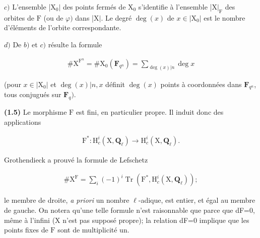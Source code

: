 \documentclass[10pt,leqno]{article}
\begin{document}
\noindent \(c)\) L’ensemble |\(\mathrm{X}_{0}|\) des points fermés de \(\mathrm{X}_{0}\) s’identifie à l’ensemble |\(\mathrm{X}|_{\mathrm{F}}\) des orbites de \(\mathrm{F}\) (ou de \(\varphi )\) dans |\(\mathrm{X}|\). Le degré \(\operatorname{deg}(x)\) de \(x\in |\mathrm{X}_{0}|\) est le nombre d’éléments de l’orbite correspondante.\par

\noindent \(d)\) De \(b)\) et \(c)\) résulte la formule\par

\begin{equation*}\begin{gathered}\# \mathrm{X}^{\mathrm{F}^{n}} = \# \mathrm{X}_{0}(\mathbf{F}_{q^{n}}) = \sum _{\operatorname{deg}(x)|n} \operatorname{deg} x\end{gathered}\tag{1.4.1}\end{equation*}

\noindent (pour \(x\in |\mathrm{X}_{0}|\) et \(\operatorname{deg}(x)|n, x\) définit \(\operatorname{deg}(x)\) points à coordonnées dans \(\mathbf{F}_{q^{n}}\), tous conjugués sur \(\mathbf{F}_{q})\).\par

\noindent \textbf{(1.5)} Le morphisme \(\mathrm{F}\) est fini, en particulier propre. Il induit donc des applications\par

\begin{equation*}\begin{gathered}\mathrm{F}^{*} : \mathrm{H}_{c}^{i}(\mathrm{X}, \mathbf{Q}_{\ell }) \longrightarrow  \mathrm{H}_{c}^{i}(\mathrm{X}, \mathbf{Q}_{\ell }).\end{gathered}\end{equation*}

\noindent Grothendieck a prouvé la formule de Lefschetz\par

\begin{equation*}\begin{gathered}\# \mathrm{X}^{\mathrm{F}} = \sum _{i} (- 1)^{i} \operatorname{Tr}(\mathrm{F}^{*}, \mathrm{H}_{c}^{i}(\mathrm{X}, \mathbf{Q}_{\ell }));\end{gathered}\end{equation*}

\noindent le membre de droite, \emph{a priori} un nombre \(\ell \)-adique, est entier, et égal au membre de gauche. On notera qu’une telle formule n’est raisonnable que parce que dF=0, même à l’infini (\(\mathrm{X}\) n’est pas supposé propre); la relation dF=0 implique que les points fixes de \(\mathrm{F}\) sont de multiplicité un.\par
\end{document}
